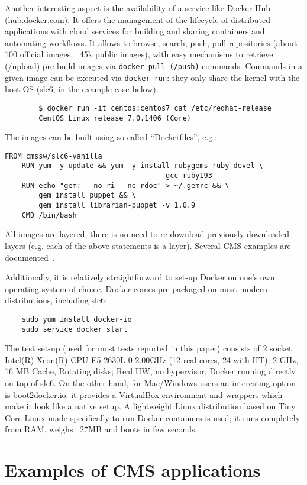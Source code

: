 \documentclass{PoS}
\begin{document}
Another interesting aspect is the availability of a service like Docker Hub (hub.docker.com). It offers the management of the lifecycle of distributed applications with cloud services for building and sharing containers and automating workflows. It allows to browse, search, push, pull repositories (about 100 official images, ~45k public images), with easy mechanisms to retrieve (/upload) pre-build images via \texttt{docker pull (/push)} commands. Commands in a given image can be executed via \texttt{docker run}:
they only share the kernel with the host OS (slc6, in the example case below):
%
\begin{verbatim}
        $ docker run -it centos:centos7 cat /etc/redhat-release
        CentOS Linux release 7.0.1406 (Core)
\end{verbatim}
%
The images can be built using so called ``Dockerfiles'', e.g.:
%
\begin{verbatim}
FROM cmssw/slc6-vanilla
    RUN yum -y update && yum -y install rubygems ruby-devel \
                                      gcc ruby193
    RUN echo "gem: --no-ri --no-rdoc" > ~/.gemrc && \
        gem install puppet && \
        gem install librarian-puppet -v 1.0.9
    CMD /bin/bash
\end{verbatim}
%
All images are layered, there is no need to re-download previously downloaded layers (e.g. each of the above statements is a layer). Several CMS examples are documented~\cite{DockerGiulio}.

Additionally, it is relatively straightforward to set-up Docker on one's own operating system of choice. Docker comes pre-packaged on most modern distributions, including slc6:
%
\begin{verbatim}
    sudo yum install docker-io
    sudo service docker start
\end{verbatim}
%
The test set-up (used for most tests reported in this paper) consists of 2 socket Intel(R) Xeon(R) CPU E5-2630L 0 \@ 2.00GHz (12 real cores, 24 with HT); 2 GHz, 16 MB Cache, Rotating disks; Real HW, no hypervisor, Docker running directly on top of slc6. On the other hand, for Mac/Windows users an interesting option is boot2docker.io: it provides a VirtualBox environment and wrappers which make it look like a native setup. A lightweight Linux distribution based on Tiny Core Linux made specifically to run Docker containers is used; it runs completely from RAM, weighs ~27MB and boots in few seconds.

\section{Examples of CMS applications}
\end{document}
